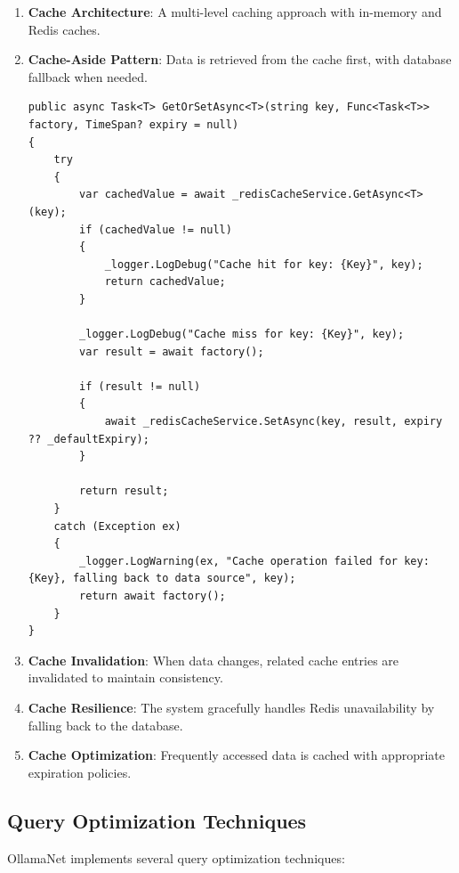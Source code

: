 \begin{enumerate}
   \item \textbf{Cache Architecture}: A multi-level caching approach with in-memory and Redis caches.

   \item \textbf{Cache-Aside Pattern}: Data is retrieved from the cache first, with database fallback when needed.

\begin{verbatim}
public async Task<T> GetOrSetAsync<T>(string key, Func<Task<T>> factory, TimeSpan? expiry = null)
{
    try
    {
        var cachedValue = await _redisCacheService.GetAsync<T>(key);
        if (cachedValue != null)
        {
            _logger.LogDebug("Cache hit for key: {Key}", key);
            return cachedValue;
        }

        _logger.LogDebug("Cache miss for key: {Key}", key);
        var result = await factory();
        
        if (result != null)
        {
            await _redisCacheService.SetAsync(key, result, expiry ?? _defaultExpiry);
        }
        
        return result;
    }
    catch (Exception ex)
    {
        _logger.LogWarning(ex, "Cache operation failed for key: {Key}, falling back to data source", key);
        return await factory();
    }
}
\end{verbatim}

   \item \textbf{Cache Invalidation}: When data changes, related cache entries are invalidated to maintain consistency.

   \item \textbf{Cache Resilience}: The system gracefully handles Redis unavailability by falling back to the database.

   \item \textbf{Cache Optimization}: Frequently accessed data is cached with appropriate expiration policies.
\end{enumerate}

\subsection{Query Optimization Techniques}

OllamaNet implements several query optimization techniques:

